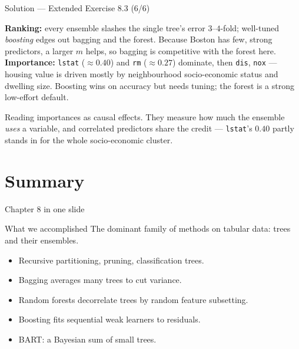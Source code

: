 \documentclass[aspectratio=169,11pt]{beamer}
\begin{document}
\begin{frame}{Solution --- Extended Exercise 8.3 (6/6)}
\begin{solutionbox}
\textbf{Ranking:} every ensemble slashes the single tree's error $3$--$4$-fold; well-tuned \emph{boosting} edges out bagging and the forest. Because Boston has few, strong predictors, a larger $m$ helps, so bagging is competitive with the forest here. \textbf{Importance:} \texttt{lstat} ($\approx0.40$) and \texttt{rm} ($\approx0.27$) dominate, then \texttt{dis}, \texttt{nox} --- housing value is driven mostly by neighbourhood socio-economic status and dwelling size. Boosting wins on accuracy but needs tuning; the forest is a strong low-effort default.
\end{solutionbox}
\begin{mistake}
Reading importances as causal effects. They measure how much the ensemble \emph{uses} a variable, and correlated predictors share the credit --- \texttt{lstat}'s $0.40$ partly stands in for the whole socio-economic cluster.
\end{mistake}
\end{frame}



\section{Summary}

\begin{frame}{Chapter 8 in one slide}
  \begin{block}{What we accomplished}
    The dominant family of methods on tabular data: trees and their
    ensembles.
  \end{block}
  \begin{itemize}
    \item Recursive partitioning, pruning, classification trees.
    \item Bagging averages many trees to cut variance.
    \item Random forests decorrelate trees by random feature subsetting.
    \item Boosting fits sequential weak learners to residuals.
    \item BART: a Bayesian sum of small trees.
  \end{itemize}
\end{frame}
\end{document}
